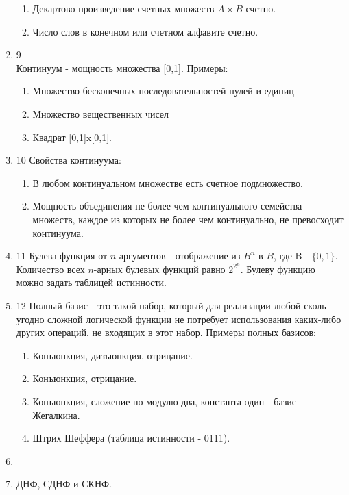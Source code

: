 \documentclass[a4paper,12pt]{article}
\begin{document}
\begin{enumerate}
\begin{enumerate}
			\item Декартово произведение счетных множеств $A \times B$ счетно.
			\item Число слов в конечном или счетном алфавите счетно.
		\end{enumerate}
		\item 9 \\
		Континуум - мощность множества [0,1]. Примеры:
		\begin{enumerate}
			\item Множество бесконечных последовательностей нулей и единиц
			\item Множество вещественных чисел
			\item Квадрат [0,1]x[0,1].
		\end{enumerate}
		\item 10
		Свойства континуума:
		\begin{enumerate}
		\item В любом континуальном множестве есть счетное подмножество.
		\item Мощность объединения не более чем континуального семейства множеств,
		каждое из которых не более чем континуально, не превосходит континуума.
		\end{enumerate}
		
		\item 11
		Булева функция от $n$ аргументов - отображение из $B^{n}$ в $B$, где B - $\{0,1\}$.
		Количество всех $n$-арных булевых функций равно $2^{2^{n}}$. Булеву функцию можно задать таблицей истинности.
		
		\item 12
		Полный базис - это такой набор, который для реализации любой сколь
		угодно сложной логической функции не потребует использования каких-либо других
		операций, не входящих в этот набор.
		Примеры полных базисов:

		\begin {enumerate}
		\item Конъюнкция, дизъюнкция, отрицание.
		\item Конъюнкция, отрицание.
		\item Конъюнкция, сложение по модулю два, константа один - базис Жегалкина.
		\item Штрих Шеффера (таблица истинности - 0111).
		\end {enumerate}
               
        \item

        \item ДНФ, СДНФ и СКНФ.


\end{enumerate}
\end{document}

